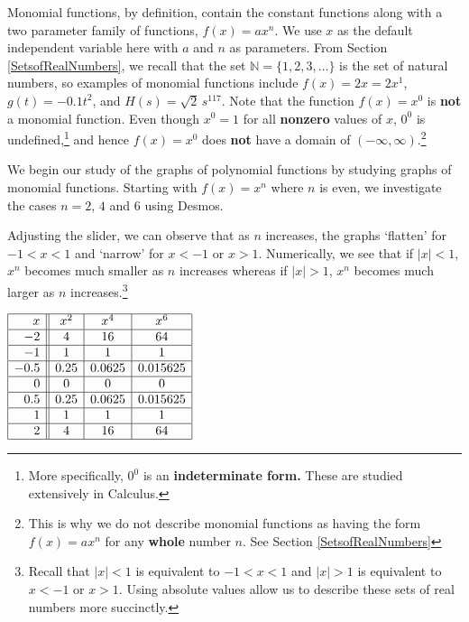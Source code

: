 \documentclass{ximera}
\begin{document}
Monomial functions, by definition, contain the constant functions along with a two parameter family of functions, $f(x) = ax^n$.  We use $x$ as the default independent variable here with $a$ and $n$ as parameters.  From Section \ref{SetsofRealNumbers}, we recall that the set $\mathbb{N} = \{ 1, 2, 3, \ldots \}$ is the set of natural numbers, so examples of monomial functions include $f(x) = 2x = 2x^{1}$, $g(t) = -0.1 t^2$, and $H(s) = \sqrt{2} \, s^{117}$.  Note that the function $f(x) = x^0$ is \textbf{not} a monomial function.  Even though $x^0 = 1$ for all \textbf{nonzero} values of $x$, $0^{0}$ is undefined,\footnote{More specifically, $0^0$ is an \textbf{indeterminate form.}  These are studied extensively in Calculus.} and hence $f(x) = x^0$ does \textbf{not} have a domain of $(-\infty, \infty)$.\footnote{This is why we do not describe monomial functions as having the form $f(x) = ax^n$ for any \textbf{whole} number $n$. See Section \ref{SetsofRealNumbers}}


We begin our study of the graphs of polynomial functions by studying graphs of monomial functions.  Starting with $f(x) = x^n$ where $n$ is even, we investigate the cases $n = 2$, $4$ and $6$ using Desmos. 

\begin{center} 
\end{center}

Adjusting the slider, we can observe that as $n$ increases, the graphs `flatten'  for $-1<x<1$  and `narrow'  for $x<-1$ or $x>1$.    Numerically, we see that if $|x|<1$,  $x^n$ becomes much smaller as $n$ increases whereas if $|x|>1$, $x^n$ becomes much larger as $n$ increases.\footnote{Recall that $|x| < 1$ is equivalent to $-1<x<1$ and $|x|>1$ is equivalent to $x<-1$ or $x>1$.  Using absolute values allow us to describe these sets of real numbers more succinctly.}   


\begin{center}
$\begin{array}{|r||c|c|c|}  \hline
x &  x^2 & x^4 & x^6 \\ \hline
 -2 & 4& 16& 64 \\  \hline
 -1 & 1 & 1&  1\\  \hline
 -0.5 & 0.25 & 0.0625&  0.015625 \\  \hline
 0 &  0 & 0 & 0 \\  \hline
 0.5 & 0.25  &  0.0625 & 0.015625 \\  \hline
 1&  1 & 1&  1 \\  \hline
 2 & 4 & 16 & 64 \\ \hline \end{array}$
\end{center}
\end{document}

